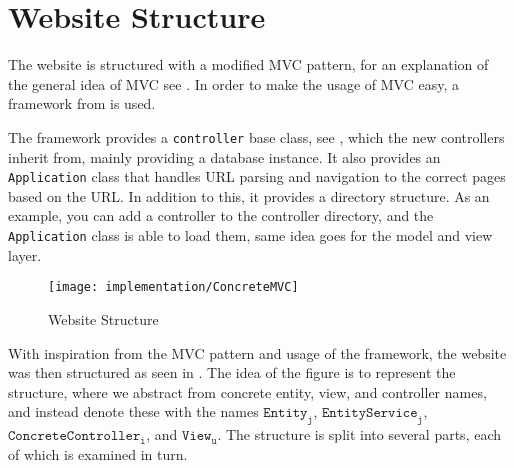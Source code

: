 \section{Website Structure}\label{sec:websitestructure}
The website is structured with a modified MVC pattern, for an explanation of the general idea of MVC see .
In order to make the usage of MVC easy, a framework from \citep{misc:mvc-framework} is used.

The framework provides a \texttt{controller} base class, see , which the new controllers inherit from, mainly providing a database instance.
It also provides an \texttt{Application} class that hand\-les URL parsing and navigation to the correct pages based on the URL.
In addition to this, it provides a directory structure. As an example, you can add a controller to the controller directory, and the \texttt{Application} class is able to load them, same idea goes for the model and view layer.

\begin{figure}[h]
	\centering
	\texttt{[image: implementation/ConcreteMVC]}
	\caption{Website Structure}\label{fig:websitestructure}
\end{figure}

With inspiration from the MVC pattern and usage of the framework, the website was then structured as seen in .
The idea of the figure is to represent the structure, where we abstract from concrete entity, view, and controller names, and instead denote these with the names $\texttt{Entity}_\texttt{j}$, $\texttt{EntityService}_\texttt{j}$, $\texttt{ConcreteController}_\texttt{i}$, and $\texttt{View}_\texttt{u}$.
The structure is split into several parts, each of which is examined in turn. 

